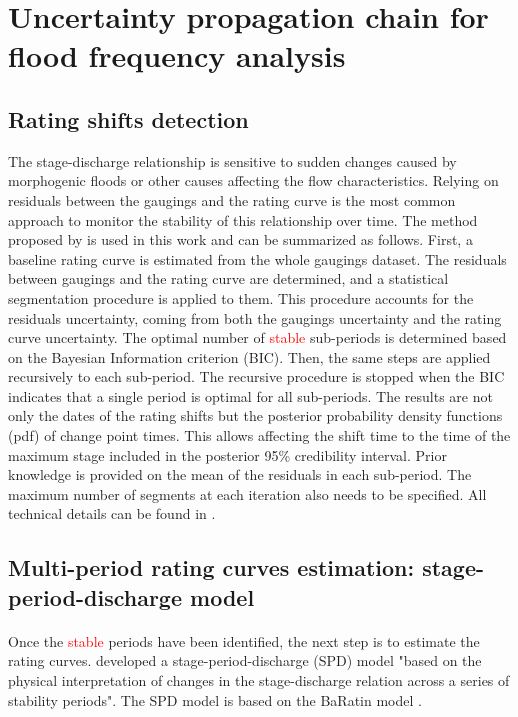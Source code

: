 \documentclass[11pt]{article}
\begin{document}
\section{Uncertainty propagation chain for flood frequency analysis}
     \subsection{Rating shifts detection}
     \label{subsec:RatingShifts}
    
    The stage-discharge relationship is sensitive to sudden changes caused by morphogenic floods or other causes affecting the flow characteristics. Relying on residuals between the gaugings and the rating curve is the most common approach to monitor the stability of this relationship over time. The method proposed by \citet{darienzo_detection_2021} is used in this work and can be summarized as follows. First, a baseline rating curve is estimated from the whole gaugings dataset. The residuals between gaugings and the rating curve are determined, and a statistical segmentation procedure is applied to them. This procedure accounts for the residuals uncertainty, coming from both the gaugings uncertainty and the rating curve uncertainty. The optimal number of \textcolor{red}{stable} sub-periods is determined based on the Bayesian Information criterion (BIC). Then, the same steps are applied recursively to each sub-period. The recursive procedure is stopped when the BIC indicates that a single period is optimal for all sub-periods. The results are not only the dates of the rating shifts but the posterior probability density functions (pdf) of change point times. This allows affecting the shift time to the time of the maximum stage included in the posterior 95\% credibility interval. Prior knowledge is provided on the mean of the residuals in each sub-period. The maximum number of segments at each iteration also needs to be specified. All technical details can be found in \citet{darienzo_detection_2021}.
    
    \subsection{Multi-period rating curves estimation: stage-period-discharge model}
    \label{subsec:RC_SPD}
    \paragraph{}
    Once the \textcolor{red}{stable} periods have been identified, the next step is to estimate the rating curves. \citet{mansanarez_shift_2019} developed a stage-period-discharge (SPD) model "based on the physical interpretation of changes in the stage-discharge relation across a series of stability periods". The SPD model is based on the BaRatin model \citep{le_coz_combining_2014}.
\end{document}
